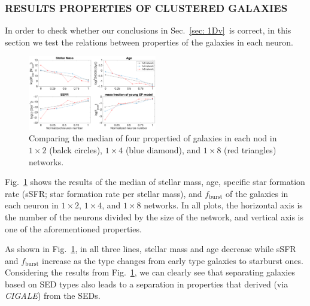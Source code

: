                         
        
        
        \subsubsection{RESULTS PROPERTIES OF CLUSTERED GALAXIES}
        
        In order to check whether our conclusions in Sec.~\ref{sec: 1Dv}~is correct, in this section we test the relations between properties of the galaxies in each neuron.
        
        \begin{figure}
            \centering
            \includegraphics[width=0.5\textwidth]{images0.01/1d/props5.png}
            \caption{Comparing the median of four propertied of galaxies in each nod in $1\times2$ (balck circles), $1\times4$ (blue diamond), and $1\times8$ (red triangles) networks.}
            \label{fig: props}
        \end{figure}
       
        Fig.~\ref{fig: props} shows the results of the median of stellar mass, age, specific star formation rate (sSFR; star formation rate per stellar mass), and $f_\mathrm{burst}$ of the galaxies in each neuron in $1\times2$, $1\times4$, and $1\times8$ networks.
        In all plots, the horizontal axis is the number of the neurons divided by the size of the network, and vertical axis is one of the aforementioned properties.
        
        As shown in Fig.~\ref{fig: props}, in all three lines, stellar mass and age decrease while sSFR and $f_\mathrm{burst}$ increase as the type changes from early type galaxies to starburst ones. 
        Considering the results from Fig.~\ref{fig: props}, we can clearly see that separating galaxies based on SED types also leads to a separation in properties that derived (via {\em CIGALE}) from the SEDs.
    
